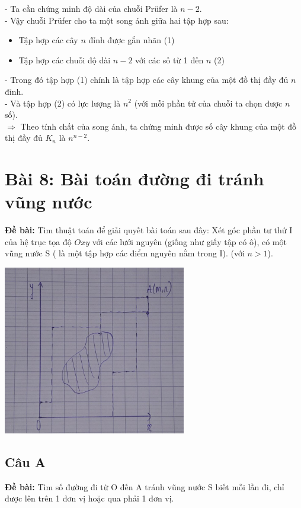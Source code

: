 \documentclass[12pt]{article}
\begin{document}
\begin{sloppypar}
- Ta cần chứng minh độ dài của chuỗi Prüfer là \(n-2\). \\
- Vậy chuỗi Prüfer cho ta một song ánh giữa hai tập hợp sau:

\begin{itemize}
    \item Tập hợp các cây \(n\) đỉnh được gắn nhãn                      (1)
    \item Tập hợp các chuỗi độ dài \(n-2\) với các số từ 1 đến \(n\)    (2)
\end{itemize}

- Trong đó tập hợp (1) chính là tập hợp các cây khung của một đồ thị đầy đủ \(n\) đỉnh. \\
- Và tập hợp (2) có lực lượng là \(n^{2}\) (với mỗi phần tử của chuỗi ta chọn được \(n\) số). \\
\(\Rightarrow\) Theo tính chất của song ánh, ta chứng minh được số cây khung của một đồ thị đầy đủ \(K_{n}\) là \(n^{n-2}\).

\section{Bài 8: Bài toán đường đi tránh vũng nước}
\begin{tcolorbox}
    \textbf{Đề bài:} Tìm thuật toán để giải quyết bài toán sau đây: Xét góc phần tư thứ I của hệ trục tọa độ \(Oxy\) với các lưới nguyên (giống như giấy tập có ô), có một vũng nước S ( là một tập hợp các điểm nguyên nằm trong I).
    (với \(n > 1\)).
\end{tcolorbox}

\begin{center}
    {\includegraphics[width=8cm]{7.png}}
\end{center}

\subsection{Câu A}
\begin{tcolorbox}
    \textbf{Đề bài:} Tìm số đường đi từ O đến A tránh vũng nước S biết mỗi lần đi, chỉ được lên trên 1 đơn vị hoặc qua phải 1 đơn vị.
\end{tcolorbox}


\end{sloppypar}
\end{document}
